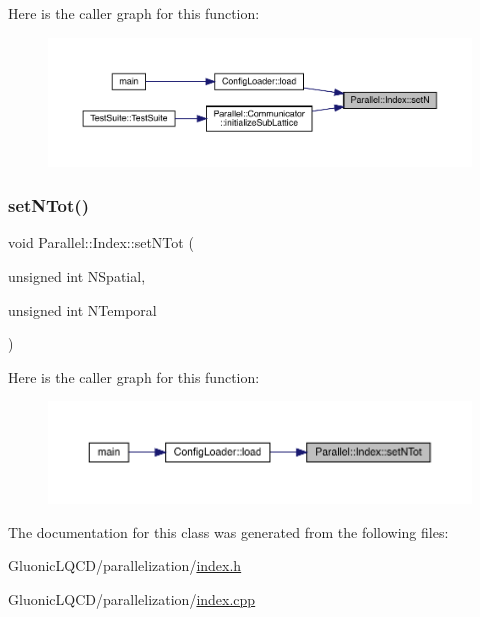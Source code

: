 Here is the caller graph for this function\+:\nopagebreak
\begin{figure}[H]
\begin{center}
\leavevmode
\includegraphics[width=350pt]{class_parallel_1_1_index_ab8650936d7000d54b811dd128618f9ad_icgraph}
\end{center}
\end{figure}
\mbox{\label{class_parallel_1_1_index_a14d1d30c926a76761ed1a1a51912a516}} 
\subsubsection{\texorpdfstring{setNTot()}{setNTot()}}
{\footnotesize\ttfamily void Parallel\+::\+Index\+::set\+N\+Tot (\begin{DoxyParamCaption}\item[{unsigned int}]{N\+Spatial,  }\item[{unsigned int}]{N\+Temporal }\end{DoxyParamCaption})\hspace{0.3cm}{\ttfamily [static]}}

Here is the caller graph for this function\+:\nopagebreak
\begin{figure}[H]
\begin{center}
\leavevmode
\includegraphics[width=350pt]{class_parallel_1_1_index_a14d1d30c926a76761ed1a1a51912a516_icgraph}
\end{center}
\end{figure}


The documentation for this class was generated from the following files\+:\begin{DoxyCompactItemize}
\item 
Gluonic\+L\+Q\+C\+D/parallelization/\mbox{\hyperlink{index_8h}{index.\+h}}\item 
Gluonic\+L\+Q\+C\+D/parallelization/\mbox{\hyperlink{index_8cpp}{index.\+cpp}}\end{DoxyCompactItemize}
